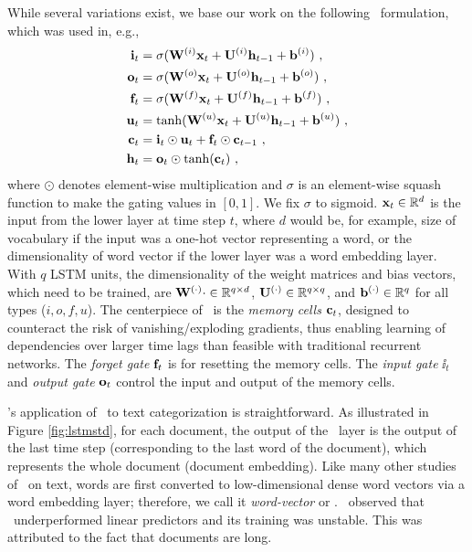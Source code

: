 \documentclass{article}
\begin{document}
\mypara{\lstm} 
While several variations exist, 
we base our work on the following \lstm\ formulation, 
which was used in, e.g., \cite{ZI14} 
\newcommand{\squash}{\sigma}
\begin{align*}
\ii_t &= \squash(\Wx{i}\xx_t + \Wh{i}\hh_{t-1} + \bbb{i} )~, \\
\oo_t &= \squash(\Wx{o}\xx_t + \Wh{o}\hh_{t-1} + \bbb{o} )~, \\
\ff_t &= \squash(\Wx{f}\xx_t + \Wh{f}\hh_{t-1} + \bbb{f} )~, \\
\uu_t &= \tanh(\Wx{u}\xx_t + \Wh{u}\hh_{t-1} + \bbb{u} )~, \\
\cc_t &= \ii_t \odot \uu_t + \ff_t \odot \cc_{t-1}~, \\
\hh_t &= \oo_t \odot \tanh(\cc_t)~,
\end{align*}
where $\odot$ denotes element-wise multiplication and 
$\squash$ is an element-wise squash function to make the gating values in $[0,1]$.  
We fix $\squash$ to sigmoid.  ${\mathbf x}_t \in \mathbb{R}^d$ is the input from the lower layer 
at time step $t$, where $d$ would be, for example, 
size of vocabulary if the input was a one-hot vector representing a word, 
or the dimensionality of word vector if the lower layer was a word embedding layer. 
With $q$ LSTM units, the dimensionality of the weight matrices and bias vectors, which need to be trained, are 
${\mathbf W}^{(\cdot)}{\cdot} \in \mathbb{R}^{q\times d}$, ${\mathbf U}^{(\cdot)} \in \mathbb{R}^{q\times q}$, and ${\mathbf b}^{(\cdot)} \in \mathbb{R}^q$ for all types ($i,o,f,u$). 
The centerpiece of \lstm\ is the {\em memory cells} 
${\mathbf c}_t$, 
designed to counteract the risk of vanishing/exploding gradients, 
thus enabling learning of dependencies over larger time lags 
than feasible with traditional recurrent networks. 
The {\em forget gate} ${\mathbf f}_t$ \cite{GSC00} is for resetting the memory cells.  
The {\em input gate} $\ii_t$ and {\em output gate} ${\mathbf o}_t$ control 
the input and output of the memory cells.  

\DLa's application of \lstm\ to text categorization is straightforward.  
As illustrated in Figure \ref{fig:lstmstd}, 
for each document, 
the output of the \lstm\ layer is the output of the last time step (corresponding to the last word of the document), 
which represents the whole document (document embedding). 
Like many other studies of \lstm\ on text, words are first converted to 
low-dimensional dense word vectors via a word embedding layer; therefore, 
we call it {\em word-vector \lstm} or {\em \wvLstm}. 
\DLa\ observed that 
\wvLstm\ underperformed linear predictors and its training was unstable.  
This was attributed to the fact that documents are long. 
\end{document}
